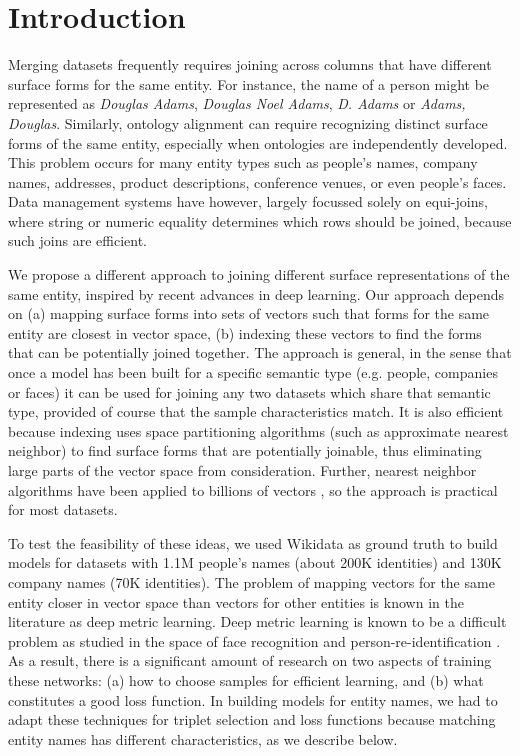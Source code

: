 \section{Introduction}

Merging datasets frequently requires joining across columns that have
different surface forms for the same entity.  For instance, the name of a person might be represented as \textit{Douglas Adams}, \textit{Douglas Noel Adams}, \textit{D. Adams} or \textit{Adams, Douglas}.  Similarly, ontology alignment can require recognizing distinct surface forms of
the same entity, especially when ontologies are independently
developed.  This problem occurs for many entity types such as people's names, company names, addresses, product descriptions, conference venues, or even people's faces.  Data management systems have however, largely focussed solely on equi-joins, where string or numeric equality determines which rows should be joined, because such joins are efficient.

We propose a different approach to joining different surface representations of the same entity, inspired by recent advances in deep learning.  Our approach depends on (a) mapping surface forms into sets of vectors such that forms for the same entity are closest in vector space, (b) indexing these vectors to find the forms that can be potentially joined together.  The approach is general, in the sense that once a model has been built for a specific semantic type (e.g. people, companies or faces) it can be used for joining any two datasets which share that semantic type, provided of course that the sample characteristics match.  It is also efficient because indexing uses space partitioning algorithms (such as approximate nearest neighbor) to find surface forms that are potentially joinable, thus eliminating large parts of the vector space from consideration.  Further, nearest neighbor algorithms have been applied to billions of vectors \cite{JDH17}, so the approach is practical for most datasets.  

To test the feasibility of these ideas, we used Wikidata as ground truth to build models for datasets with 1.1M people's names (about 200K identities) and 130K company names (70K identities).  The problem of mapping vectors for the same entity closer in vector space than vectors for other entities is known in the literature as deep metric learning.  Deep metric learning is known to be a difficult problem as studied in the space of face recognition and person-re-identification \cite{DBLP:conf/cvpr/SchroffKP15}.  As a result, there is a significant amount of research on two aspects of training these networks: (a) how to choose samples for efficient learning, and (b) what constitutes a good loss function.  In building models for entity names, we had to adapt these techniques for triplet selection and loss functions because matching entity names has different characteristics, as we describe below.


